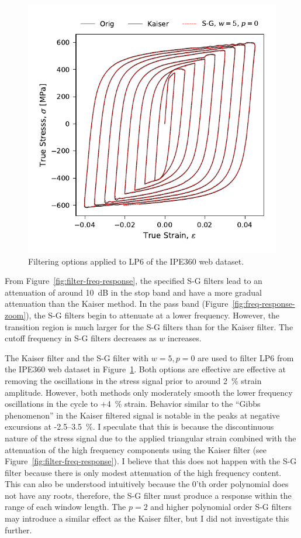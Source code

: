 \documentclass[a4paper,11pt]{article}
\begin{document}
\begin{figure}
    \centering
    \includegraphics{test_kaiser_win.pdf}
    \caption{Filtering options applied to LP6 of the IPE360 web dataset.}
    \label{fig:filtering-options}
\end{figure}


From Figure~\ref{fig:filter-freq-response}, the specified S-G filters lead to an attenuation of around 10~dB in the stop band and have a more gradual attenuation than the Kaiser method.
In the pass band (Figure~\ref{fig:freq-response-zoom}), the S-G filters begin to attenuate at a lower frequency.
However, the transition region is much larger for the S-G filters than for the Kaiser filter.
The cutoff frequency in S-G filters decreases as $w$ increases.

The Kaiser filter and the S-G filter with $w = 5, p = 0$ are used to filter LP6 from the IPE360 web dataset in Figure~\ref{fig:filtering-options}.
Both options are effective are effective at removing the oscillations in the stress signal prior to around 2~\% strain amplitude.
However, both methods only moderately smooth the lower frequency oscillations in the cycle to +4~\% strain.
Behavior similar to the ``Gibbs phenomenon'' in the Kaiser filtered signal is notable in the peaks at negative excursions at -2.5--3.5~\%.
I speculate that this is because the discontinuous nature of the stress signal due to the applied triangular strain combined with the attenuation of the high frequency components using the Kaiser filter (see Figure~\ref{fig:filter-freq-response}).
I believe that this does not happen with the S-G filter because there is only modest attenuation of the high frequency content.
This can also be understood intuitively because the 0'th order polynomial does not have any roots, therefore, the S-G filter must produce a response within the range of each window length.
The $p = 2$ and higher polynomial order S-G filters may introduce a similar effect as the Kaiser filter, but I did not investigate this further.
\end{document}

